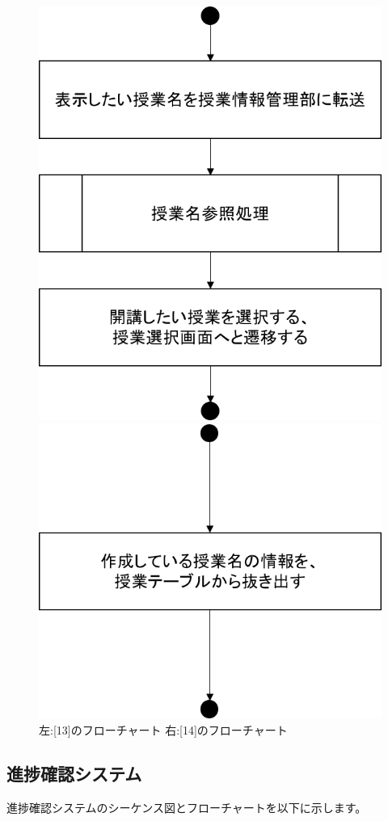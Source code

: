 \begin{figure}[htbp]
 \begin{minipage}{0.5\hsize}
  \begin{center}
   \includegraphics[width=0.45\linewidth,clip]{./img/takeover_lecture/sub13.png}
  \end{center}
 \end{minipage}
 \begin{minipage}{0.5\hsize}
  \begin{center}
   \includegraphics[width=0.45\linewidth,clip]{./img/takeover_lecture/sub14.png}
  \end{center}
 \end{minipage}
 \caption{左:[13]のフローチャート 右:[14]のフローチャート}\label{fig:takeoverlectureflow6}
\end{figure}


\newpage
\subsection{進捗確認システム}
進捗確認システムのシーケンス図とフローチャートを以下に示します。

